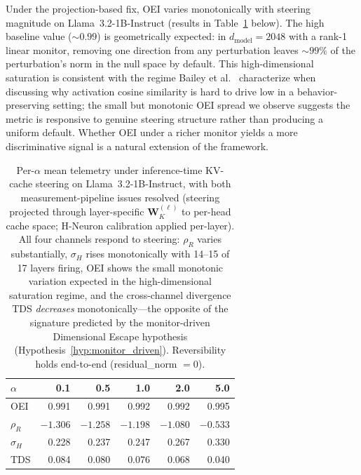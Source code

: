 \documentclass{article}
\begin{document}
Under the projection-based fix, OEI varies monotonically with steering magnitude on Llama~3.2-1B-Instruct (results in Table~\ref{tab:oei-alpha-sweep} below). The high baseline value (${\sim}0.99$) is geometrically expected: in $d_{\text{model}} = 2048$ with a rank-1 linear monitor, removing one direction from any perturbation leaves ${\sim}99\%$ of the perturbation's norm in the null space by default. This high-dimensional saturation is consistent with the regime Bailey et al.~\cite{bailey2024obfuscated} characterize when discussing why activation cosine similarity is hard to drive low in a behavior-preserving setting; the small but monotonic OEI spread we observe suggests the metric is responsive to genuine steering structure rather than producing a uniform default. Whether OEI under a richer monitor yields a more discriminative signal is a natural extension of the framework.

\begin{table}[h]
\centering
\small
\begin{tabular}{@{}lrrrrr@{}}
\toprule
$\alpha$ & 0.1 & 0.5 & 1.0 & 2.0 & 5.0 \\
\midrule
OEI & 0.991 & 0.991 & 0.992 & 0.992 & 0.995 \\
$\rho_R$ & $-1.306$ & $-1.258$ & $-1.198$ & $-1.080$ & $-0.533$ \\
$\sigma_H$ & 0.228 & 0.237 & 0.247 & 0.267 & 0.330 \\
TDS & 0.084 & 0.080 & 0.076 & 0.068 & 0.040 \\
\bottomrule
\end{tabular}
\caption{Per-$\alpha$ mean telemetry under inference-time KV-cache steering on Llama~3.2-1B-Instruct, with both measurement-pipeline issues resolved (steering projected through layer-specific $\mathbf{W}_K^{(\ell)}$ to per-head cache space; H-Neuron calibration applied per-layer). All four channels respond to steering: $\rho_R$ varies substantially, $\sigma_H$ rises monotonically with 14--15 of 17 layers firing, OEI shows the small monotonic variation expected in the high-dimensional saturation regime, and the cross-channel divergence TDS \emph{decreases} monotonically---the opposite of the signature predicted by the monitor-driven Dimensional Escape hypothesis (Hypothesis~\ref{hyp:monitor_driven}). Reversibility holds end-to-end (residual\_norm $= 0$).}
\label{tab:oei-alpha-sweep}
\end{table}
\end{document}
